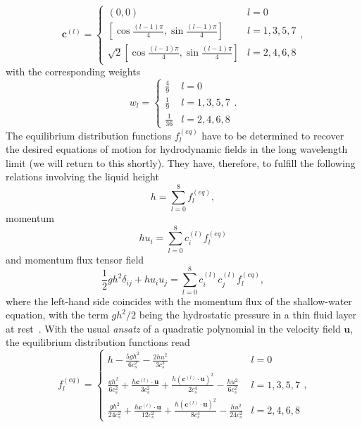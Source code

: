 \begin{equation}\label{eq:speeds}
\mathbf{c}^{(l)}  =
\left\{
\begin{array}{ll}
(0,0) & l = 0 \\
\left[\cos{\frac{(l-1)\pi}{4}}, \sin{\frac{(l-1)\pi}{4}} \right] &  l=1,3,5,7 \\
\sqrt{2}\left[\cos{\frac{(l-1)\pi}{4}}, \sin{\frac{(l-1)\pi}{4}} \right] & l=2,4,6,8
\end{array}
\right.,
\end{equation}
with the corresponding weights
\begin{equation}
w_l  =
\left\{
\begin{array}{ll}
\frac{4}{9} & l = 0 \\
\frac{1}{9} &  l=1,3,5,7 \\
\frac{1}{36} & l=2,4,6,8
\end{array}
\right..
\end{equation}
The equilibrium distribution functions $f_l^{(eq)}$ have to be determined to recover the desired equations of motion for hydrodynamic fields in the long wavelength limit (we will return to this shortly). 
They have, therefore, to fulfill the following relations involving the liquid height
\begin{equation}
    h = \sum_{l=0}^8 f_l^{(eq)},
\end{equation}
momentum
\begin{equation}
    h u_i = \sum_{l=0}^8 c_i^{(l)}f_l^{(eq)}
\end{equation}
and momentum flux tensor field
\begin{equation}\label{eq:SW_momentum_flux}
    \frac{1}{2}gh^2 \delta_{ij} + hu_i u_j = \sum_{l=0}^8 c^{(l)}_i c^{(l)}_j f_l^{(eq)},
\end{equation}
where the left-hand side coincides with the momentum flux of the shallow-water equation, with the term $gh^2/2$ being the hydrostatic pressure in a thin fluid layer at rest~\cite{dellarNonhydrodynamicModesPriori2002}.
With the usual \textit{ansatz} of a quadratic polynomial in the velocity field $\mathbf{u}$, the equilibrium distribution functions read
\begin{equation} \label{eq:equilibria}
f_l^{(eq)}  =
\left\{
\begin{array}{ll}
h - \frac{5gh^2}{6c_s^2} - \frac{2hu^2}{3c_s^2}& l = 0 \\
\frac{gh^2}{6c_s^2} + \frac{h \mathbf{c}^{(l)}\cdot \mathbf{u}}{3 c_s^2} + \frac{h(\mathbf{c}^{(l)}\cdot \mathbf{u})^2}{2 c_s^4}-\frac{hu^2}{6c_s^2} &  l=1,3,5,7 \\
\frac{gh^2}{24c_s^2} + \frac{h \mathbf{c}^{(l)}\cdot\mathbf{u}}{12 c_s^2} + \frac{h (\mathbf{c}^{(l)}\cdot\mathbf{u})^2}{8c_s^4}-\frac{hu^2}{24c_s^2} & l=2,4,6,8
\end{array}
\right.,
\end{equation}
